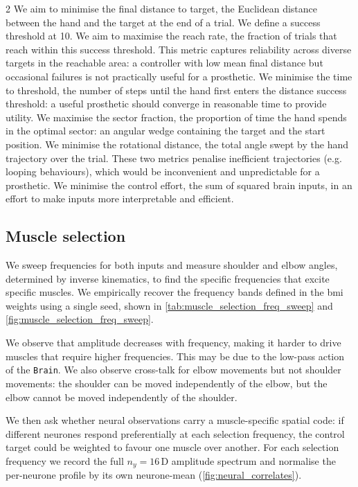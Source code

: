 \documentclass[a4paper, 10pt]{article}
\newcommand{\Brain}{\texttt{Brain}\xspace}
\newcommand{\BMI}{\ac{bmi}\xspace}
\begin{document}
\begin{multicols*}{2}
  We aim to minimise the final distance to target, the Euclidean distance
  between the hand and the target at the end of a trial. We define a success
  threshold at 10. We aim to maximise the reach rate, the fraction of trials
  that reach within this success threshold. This metric captures reliability
  across diverse targets in the reachable area: a controller with low mean final
  distance but occasional failures is not practically useful for a
  prosthetic. We minimise the time to threshold, the number of steps until the
  hand first enters the distance success threshold: a useful prosthetic should
  converge in reasonable time to provide utility. We maximise the sector
  fraction, the proportion of time the hand spends in the optimal sector: an
  angular wedge containing the target and the start position. We minimise the
  rotational distance, the total angle swept by the hand trajectory over the
  trial. These two metrics penalise inefficient trajectories (e.g. looping
  behaviours), which would be inconvenient and unpredictable for a prosthetic.
  We minimise the control effort, the sum of squared brain inputs, in an effort
  to make inputs more interpretable and efficient.

  \subsection*{Muscle selection}

  We sweep frequencies for both inputs and measure shoulder and elbow angles,
  determined by inverse kinematics, to find the specific frequencies that excite
  specific muscles. We empirically recover the frequency bands defined in the
  \BMI weights using a single seed, shown in
  \autoref{tab:muscle_selection_freq_sweep} and
  \autoref{fig:muscle_selection_freq_sweep}.

  We observe that amplitude decreases with frequency, making it harder to drive
  muscles that require higher frequencies. This may be due to the low-pass
  action of the \Brain. We also observe cross-talk for elbow movements but not
  shoulder movements: the shoulder can be moved independently of the elbow, but
  the elbow cannot be moved independently of the shoulder.

  We then ask whether neural observations carry a muscle-specific spatial code:
  if different neurones respond preferentially at each selection frequency,
  the control target could be weighted to favour one muscle over another. For each
  selection frequency we record the full $n_y = 16$\,D amplitude spectrum and
  normalise the per-neurone profile by its own neurone-mean
  (\autoref{fig:neural_correlates}).


\end{multicols*}
\end{document}

